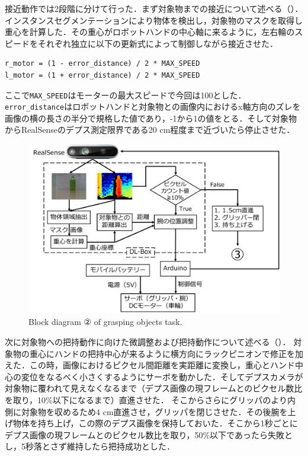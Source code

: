 接近動作では2段階に分けて行った．まず対象物までの接近について述べる（）．
インスタンスセグメンテーションにより物体を検出し，対象物のマスクを取得し重心を計算した．その重心がロボットハンドの中心軸に来るように，左右輪のスピードをそれぞれ独立に以下の更新式によって制御しながら接近させた．
\begin{lstlisting}[caption=接近アルゴリズム, label=code:motor]
r_motor = (1 - error_distance) / 2 * MAX_SPEED
l_motor = (1 + error_distance) / 2 * MAX_SPEED
\end{lstlisting}
ここで\texttt{MAX\_SPEED}はモーターの最大スピードで今回は100とした．\texttt{error\_distance}はロボットハンドと対象物との画像内におけるx軸方向のズレを画像の横の長さの半分で規格した値であり，-1から1の値をとる．そして対象物からRealSenseのデプス測定限界である20 cm程度まで近づいたら停止させた．

\begin{figure}[H]
    \centering
    \includegraphics[width=\linewidth]{figure/chapter4/2号機制御図_把持-3}
    \caption{Block diagram ② of grasping objects task.}
    \label{fig:2号機把持}
\end{figure}

次に対象物への把持動作に向けた微調整および把持動作について述べる（）．
対象物の重心にハンドの把持中心が来るように横方向にラックピニオンで修正を加えた．この時，画像におけるピクセル間距離を実距離に変換し，重心とハンド中心の変位をなるべく小さくするようにサーボを動かした．そしてデプスカメラが対象物に覆われて見えなくなるまで（デプス画像の現フレームとのピクセル数比を取り，10\%以下になるまで）直進させた．
そこからさらにグリッパのより内側に対象物を収めるため4 cm直進させ，グリッパを閉じさせた．その後腕を上げ物体を持ち上げ，この際のデプス画像を保持しておいた．そこから1秒ごとにデプス画像の現フレームとのピクセル数比を取り，50\%以下であったら失敗とし，5秒落とさず維持したら把持成功とした．

